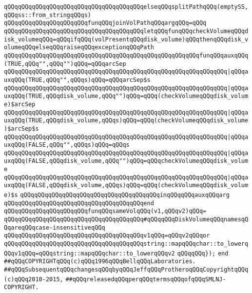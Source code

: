\verb|qQQqqQQqqQQqqQQqqQQqqQQqqQQqqQQqqQQqqQQqelseqQQqsplitPathqQQq(emptySS,qQQqss::from_stringqQQqs)|\newline
\newline
\verb|qQQqqQQqqQQqqQQqqQQqqQQqfunqQQqjoinVolPathqQQqargqQQq=qQQq|\newline
\verb|qQQqqQQqqQQqqQQqqQQqqQQqqQQqqQQqqQQqqQQqletqQQqfunqQQqcheckVolumeqQQqdisk_volumeqQQq=qQQqifqQQq(volPresentqQQqdisk_volume)qQQqthenqQQqdisk_volumeqQQqelseqQQqraiseqQQqexceptionqQQqPath|\newline
\verb|qQQqqQQqqQQqqQQqqQQqqQQqqQQqqQQqqQQqqQQqqQQqqQQqqQQqqQQqfunqQQqauxqQQq(TRUE,qQQq"",qQQq"")qQQq=qQQqarcSep|\newline
\verb|qQQqqQQqqQQqqQQqqQQqqQQqqQQqqQQqqQQqqQQqqQQqqQQqqQQqqQQqqQQqqQQq|\verb#|qQQqauxqQQq(TRUE,qQQq"",qQQqs)qQQq=qQQqarcSep$s#\newline
\verb|qQQqqQQqqQQqqQQqqQQqqQQqqQQqqQQqqQQqqQQqqQQqqQQqqQQqqQQqqQQqqQQq|\verb#|qQQqauxqQQq(TRUE,qQQqdisk_volume,qQQq"")qQQq=qQQq(checkVolumeqQQqdisk_volume)$arcSep#\newline
\verb|qQQqqQQqqQQqqQQqqQQqqQQqqQQqqQQqqQQqqQQqqQQqqQQqqQQqqQQqqQQqqQQq|\verb#|qQQqauxqQQq(TRUE,qQQqdisk_volume,qQQqs)qQQq=qQQq(checkVolumeqQQqdisk_volume)$arcSep$s#\newline
\verb|qQQqqQQqqQQqqQQqqQQqqQQqqQQqqQQqqQQqqQQqqQQqqQQqqQQqqQQqqQQqqQQq|\verb#|qQQqauxqQQq(FALSE,qQQq"",qQQqs)qQQq=qQQqs#\newline
\verb|qQQqqQQqqQQqqQQqqQQqqQQqqQQqqQQqqQQqqQQqqQQqqQQqqQQqqQQqqQQqqQQq|\verb#|qQQqauxqQQq(FALSE,qQQqdisk_volume,qQQq"")qQQq=qQQqcheckVolumeqQQqdisk_volume#\newline
\verb|qQQqqQQqqQQqqQQqqQQqqQQqqQQqqQQqqQQqqQQqqQQqqQQqqQQqqQQqqQQqqQQq|\verb#|qQQqauxqQQq(FALSE,qQQqdisk_volume,qQQqs)qQQq=qQQq(checkVolumeqQQqdisk_volume)$s#\newline
\verb|qQQqqQQqqQQqqQQqqQQqqQQqqQQqqQQqqQQqqQQqinqQQqqQQqauxqQQqarg|\newline
\verb|qQQqqQQqqQQqqQQqqQQqqQQqqQQqqQQqqQQqqQQqend|\newline
\newline
\verb|qQQqqQQqqQQqqQQqqQQqqQQqfunqQQqsameVolqQQq(v1,qQQqv2)qQQq=|\newline
\verb|qQQqqQQqqQQqqQQqqQQqqQQqqQQqqQQqqQQqqQQq#qQQqqQQqDiskVolumeqQQqnamesqQQqareqQQqcase-insensitiveqQQq|\newline
\verb|qQQqqQQqqQQqqQQqqQQqqQQqqQQqqQQqqQQqqQQqv1qQQq=qQQqv2qQQqor|\newline
\verb|qQQqqQQqqQQqqQQqqQQqqQQqqQQqqQQqqQQqqQQqstring::mapqQQqchar::to_lowerqQQqv1qQQq=qQQqstring::mapqQQqchar::to_lowerqQQqv2|\newline
\verb|qQQqqQQq});|\newline
\verb|end|\newline
\newline
\newline
\verb|##qQQqCOPYRIGHTqQQq(c)qQQq1996qQQqBellqQQqLaboratories.|\newline
\verb|##qQQqSubsequentqQQqchangesqQQqbyqQQqJeffqQQqProtheroqQQqCopyrightqQQq(c)qQQq2010-2015,|\newline
\verb|##qQQqreleasedqQQqperqQQqtermsqQQqofqQQqSMLNJ-COPYRIGHT.|\newline

